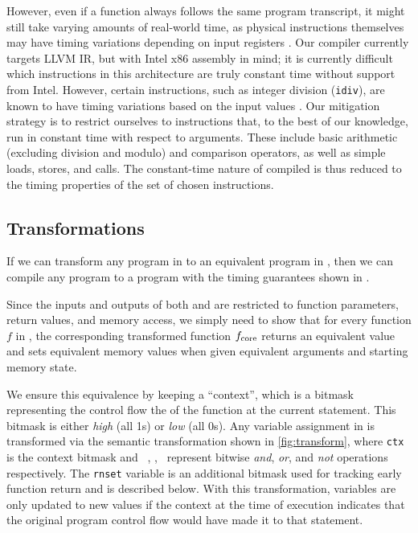However, even if a function always follows the same program transcript,
it might still take varying amounts of real-world time, as physical instructions
themselves may have timing variations depending on input registers \cite{kaufmann2016constant}. Our compiler
currently targets LLVM IR, but with Intel x86 assembly in mind; it is currently difficult
which instructions in this architecture are truly constant time without support from Intel. However, certain
instructions, such as integer division (\texttt{idiv}), are known to have timing variations
based on the input values \cite{intel2016manual}. Our
mitigation strategy is to restrict ourselves to instructions that, to the best of our knowledge,
run in constant time with respect to arguments.
These include basic arithmetic (excluding division and modulo) and comparison operators, as well as
simple loads, stores, and calls. The constant-time nature of compiled
\ccore is thus reduced to the timing properties of the set of chosen instructions.

\subsection{Transformations}

If we can transform any program in \constc to an equivalent program in \ccore, then
we can compile any \constc program to a program with the timing guarantees shown in \ccore.

Since the inputs and outputs of both \ccore
and \constc are restricted to function parameters, return values, and memory access,
we simply need to show that for
every function $f$ in \constc, the corresponding transformed function
$f_{\textnormal{core}}$ returns an equivalent value and sets equivalent memory values
when given equivalent arguments and starting memory state.

We ensure this equivalence by keeping a ``context'', which is a bitmask
representing the control flow the of the function at the current statement.
This bitmask is either \emph{high} (all 1s) or \emph{low} (all 0s).
Any variable assignment
in \constc is transformed
via the semantic transformation  shown in \autoref{fig:transform},
where \texttt{ctx} is the context bitmask and ~\band, \bor, \bnot\ represent
bitwise \emph{and}, \emph{or}, and \emph{not} operations respectively.
The \texttt{rnset}
variable is an additional bitmask used for tracking early function return and
is described below.  With this transformation, variables are only updated to
new values if the context at the time of execution indicates that the original
program control flow would have made it to that statement.

